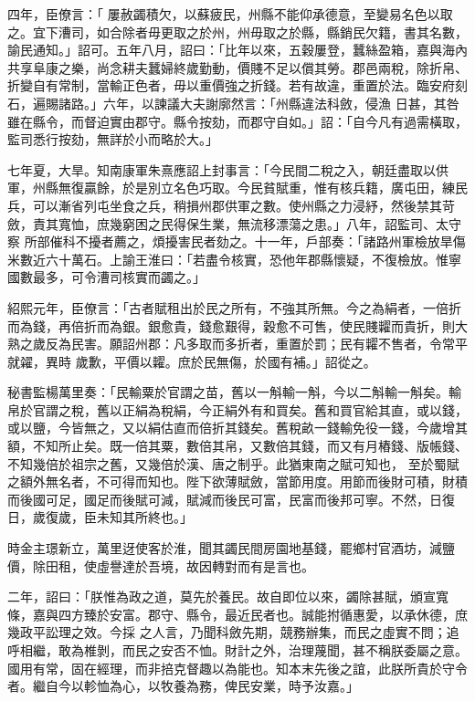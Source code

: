 \begin{pinyinscope}
 四年，臣僚言：「
 屢赦蠲積欠，以蘇疲民，州縣不能仰承德意，至變易名色以取之。宜下漕司，如合除者毋更取之於州，州毋取之於縣，縣銷民欠籍，書其名數，諭民通知。」詔可。五年八月，詔曰：「比年以來，五穀屢登，蠶絲盈箱，嘉與海內共享阜康之樂，尚念耕夫蠶婦終歲勤動，價賤不足以償其勞。郡邑兩稅，除折帛、折變自有常制，當輸正色者，毋以重價強之折錢。若有故違，重置於法。臨安府刻石，遍賜諸路。」六年，以諫議大夫謝廓然言：「州縣違法科斂，侵漁
 日甚，其咎雖在縣令，而督迫實由郡守。縣令按劾，而郡守自如。」詔：「自今凡有過需橫取，監司悉行按劾，無詳於小而略於大。」



 七年夏，大旱。知南康軍朱熹應詔上封事言：「今民間二稅之入，朝廷盡取以供軍，州縣無復贏餘，於是別立名色巧取。今民貧賦重，惟有核兵籍，廣屯田，練民兵，可以漸省列屯坐食之兵，稍損州郡供軍之數。使州縣之力浸紓，然後禁其苛斂，責其寬恤，庶幾窮困之民得保生業，無流移漂蕩之患。」八年，詔監司、太守察
 所部催科不擾者薦之，煩擾害民者劾之。十一年，戶部奏：「諸路州軍檢放旱傷米數近六十萬石。上諭王淮曰：「若盡令核實，恐他年郡縣懷疑，不復檢放。惟寧國數最多，可令漕司核實而蠲之。」



 紹熙元年，臣僚言：「古者賦租出於民之所有，不強其所無。今之為絹者，一倍折而為錢，再倍折而為銀。銀愈貴，錢愈艱得，穀愈不可售，使民賤糶而貴折，則大熟之歲反為民害。願詔州郡：凡多取而多折者，重置於罰；民有糶不售者，令常平就糴，異時
 歲歉，平價以糶。庶於民無傷，於國有補。」詔從之。



 秘書監楊萬里奏：「民輸粟於官謂之苗，舊以一斛輸一斛，今以二斛輸一斛矣。輸帛於官謂之稅，舊以正絹為稅絹，今正絹外有和買矣。舊和買官給其直，或以錢，或以鹽，今皆無之，又以絹估直而倍折其錢矣。舊稅畝一錢輸免役一錢，今歲增其額，不知所止矣。既一倍其粟，數倍其帛，又數倍其錢，而又有月樁錢、版帳錢、不知幾倍於祖宗之舊，又幾倍於漢、唐之制乎。此猶東南之賦可知也，
 至於蜀賦之額外無名者，不可得而知也。陛下欲薄賦斂，當節用度。用節而後財可積，財積而後國可足，國足而後賦可減，賦減而後民可富，民富而後邦可寧。不然，日復日，歲復歲，臣未知其所終也。」



 時金主璟新立，萬里迓使客於淮，聞其蠲民間房園地基錢，罷鄉村官酒坊，減鹽價，除田租，使虛譽達於吾境，故因轉對而有是言也。



 二年，詔曰：「朕惟為政之道，莫先於養民。故自即位以來，蠲除甚賦，頒宣寬條，嘉與四方臻於安富。郡守、縣令，最近民者也。誠能拊循惠愛，以承休德，庶幾政平訟理之效。今採
 之人言，乃聞科斂先期，競務辦集，而民之虛實不問；追呼相繼，敢為椎剝，而民之安否不恤。財計之外，治理蔑聞，甚不稱朕委屬之意。國用有常，固在經理，而非掊克督趣以為能也。知本末先後之誼，此朕所貴於守令者。繼自今以軫恤為心，以牧養為務，俾民安業，時予汝嘉。」




\end{pinyinscope}
